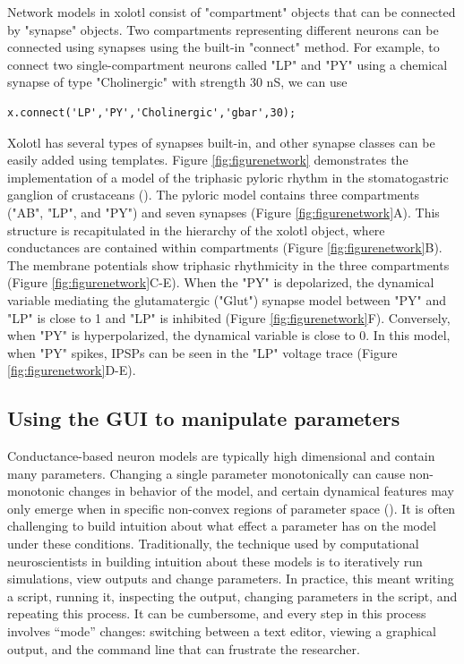 \documentclass{frontiersSCNS} %
\begin{document}
Network models in xolotl consist of "compartment" objects that can be connected by "synapse" objects. Two compartments representing different neurons can be connected using synapses using the built-in "connect" method. For example, to connect two single-compartment neurons called "LP" and "PY" using a chemical synapse of type "Cholinergic" with strength 30 nS, we can use

\begin{lstlisting}[style=Matlab-editor]
x.connect('LP','PY','Cholinergic','gbar',30); 
\end{lstlisting}

Xolotl has several types of synapses built-in, and other synapse classes can be easily added using templates. Figure \ref{fig:figurenetwork} demonstrates the implementation of a model of the triphasic pyloric rhythm in the stomatogastric ganglion of crustaceans (\cite{prinzSimilarNetworkActivity2004}). The pyloric model contains three compartments ("AB", "LP", and "PY") and seven synapses (Figure \ref{fig:figurenetwork}A). This structure is recapitulated in the hierarchy of the xolotl object, where conductances are contained within compartments (Figure \ref{fig:figurenetwork}B). The membrane potentials show triphasic rhythmicity in the three compartments (Figure \ref{fig:figurenetwork}C-E). When the "PY" is depolarized, the dynamical variable mediating the  glutamatergic ("Glut") synapse model between "PY" and "LP" is close to 1 and "LP" is inhibited (Figure \ref{fig:figurenetwork}F). Conversely, when "PY" is hyperpolarized, the dynamical variable is close to 0. In this model, when "PY" spikes, IPSPs can be seen in the "LP" voltage trace (Figure \ref{fig:figurenetwork}D-E). 



%
%
%
%
%
%

\subsection{Using the GUI to manipulate parameters}

Conductance-based neuron models are typically high dimensional and contain many parameters. Changing a single parameter monotonically can cause non-monotonic changes in behavior of the model, and certain dynamical features may only emerge when in specific non-convex regions of parameter space (\cite{golowasch2002failure}). It is often challenging to build intuition about what effect a parameter has on the model under these conditions. Traditionally, the technique used by computational neuroscientists in building intuition about these models is to iteratively run simulations, view outputs and change parameters. In practice, this meant writing a script, running it, inspecting the output, changing parameters in the script, and repeating this process. It can be cumbersome, and every step in this process involves ``mode'' changes: switching between a text editor, viewing a graphical output, and the command line that can frustrate the researcher. 
\end{document}

